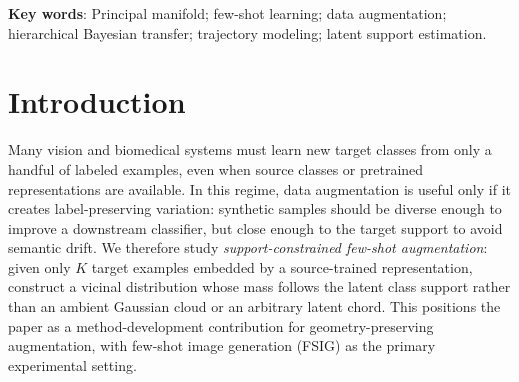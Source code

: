 \documentclass{article}
\begin{document}
\begin{abstract}
	Few-shot augmentation is a latent support-estimation problem, but finitely many unordered examples do not identify an unrestricted smooth trajectory. We introduce hierarchical Bayesian trajectory principal-manifold sampling (HB-TPM), which learns a smooth coefficient prior from ordered source tasks. For sparse unordered targets, HB-TPM alternates latent projection-index assignment with a maximum-a-posteriori coefficient update and then samples from the fitted curve using source-calibrated noise. The prior stabilizes coefficient directions weakly identified by target shots; geometric tube guarantees control only subsequent sampling. In an eight-dimensional benchmark with 48 ordered source tasks, 30 held-out targets, and $K\in\{3,5,10\}$, HB-TPM reduces mean sliced-Wasserstein distance by 21.0--41.8\% against a source-pretrained and target-adapted nonlinear VAE, winning 86 of 90 paired comparisons. A Gaussian negative control reverses this ranking, so HB-TPM is intended only for validated transferable trajectory families.
\end{abstract}

\textbf{Key words}: Principal manifold; few-shot learning; data augmentation; hierarchical Bayesian transfer; trajectory modeling; latent support estimation.

\section{Introduction}

Many vision and biomedical systems must learn new target classes from only a handful of labeled examples, even when source classes or pretrained representations are available. In this regime, data augmentation is useful only if it creates label-preserving variation: synthetic samples should be diverse enough to improve a downstream classifier, but close enough to the target support to avoid semantic drift. We therefore study \emph{support-constrained few-shot augmentation}: given only $K$ target examples embedded by a source-trained representation, construct a vicinal distribution whose mass follows the latent class support rather than an ambient Gaussian cloud or an arbitrary latent chord. This positions the paper as a method-development contribution for geometry-preserving augmentation, with few-shot image generation (FSIG) as the primary experimental setting.
\end{document}

